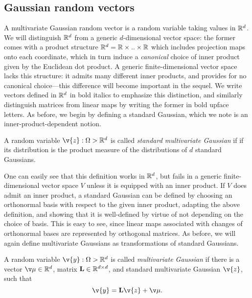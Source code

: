 \documentclass[11pt]{book}
\begin{document}
\subsection{Gaussian random vectors}

A multivariate Gaussian random vector is a random variable taking values in $\mathbb{R}^d$.
We will distinguish $\mathbb{R}^d$ from a generic $d$-dimensional vector space: the former comes with a product structure $\mathbb{R}^d = \mathbb{R} \times .. \times \mathbb{R}$ which includes projection maps onto each coordinate, which in turn induce a \emph{canonical} choice of inner product given by the Euclidean dot product.
A generic finite-dimensional vector space lacks this structure: it admits many different inner products, and provides for no canonical choice---this difference will become important in the sequel.
We write vectors defined in $\mathbb{R}^d$ in bold italics to emphasize this distinction, and similarly distinguish matrices from linear maps by writing the former in bold upface letters.
As before, we begin by defining a standard Gaussian, which we note is an inner-product-dependent notion.

\begin{definition}
A random variable $\v{z} : \Omega\->\R^d$ is called \emph{standard multivariate Gaussian} if if its distribution is the product measure of the distributions of $d$ standard Gaussians.
\end{definition}

One can easily see that this definition works in $\mathbb{R}^d$, but fails in a generic finite-dimensional vector space $V$ unless it is equipped with an inner product.
If $V$ does admit an inner product, a standard Gaussian can be defined by choosing an orthonormal basis with respect to the given inner product, adapting the above definition, and showing that it is well-defined by virtue of not depending on the choice of basis.
This is easy to see, since linear maps associated with changes of orthonormal bases are represented by orthogonal matrices.
As before, we will again define multivariate Gaussians as transformations of standard Gaussians.

\begin{definition}
A random variable $\v{y} : \Omega\->\R^d$ is called \emph{multivariate Gaussian} if there is a vector $\v\mu\in\R^d$, matrix $\m{L}\in\R^{d\x d}$, and standard multivariate Gaussian $\v{z}$, such that
\[
\v{y} = \m{L}\v{z} + \v\mu
.
\]
\end{definition}
\end{document}
